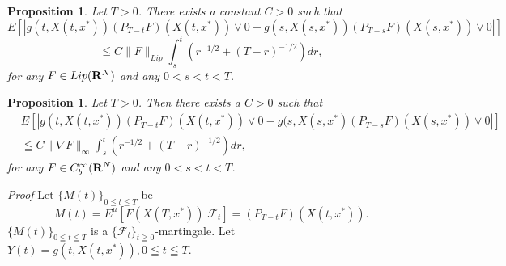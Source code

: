 \documentclass[12pt]{article}
\newtheorem{prop}[thm]{Proposition}%
\begin{document}
\begin{prop}\label{discProp}
Let $T>0$. There exists a constant $C >0$ such that
$$E[|g(t,X(t,x^*))(P_{T-t}F)(X(t,x^*)) \vee 0 - g(s,X(s,x^*))(P_{T-s}F)(X(s,x^*)) \vee 0|]$$
$$\leqq C \|F\|_{{Lip}} \int_{s}^t(r^{-1/2}+(T-r)^{-1/2})dr ,$$ for any $ F \in Lip({\bf R}^{N})$ and any $0< s < t< T$.  
\end{prop} 


\begin{prop}
Let $T>0$. Then there exists a $C>0$ such that 
\begin{align*}
&E[|g(t,X(t,x^*))(P_{T-t}F)(X(t,x^*)) \vee 0 - g(s,X(s,x^*)(P_{T-s}F)(X(s,x^*)) \vee 0|]\\
&\leqq C \|\nabla F\|_{\infty} \int_{s}^t(r^{-1/2}+(T-r)^{-1/2})dr ,
\end{align*}
for any $ F \in C_b^{\infty}({\bf R}^{N})$ and any $0< s < t< T$. 
\end{prop}


{\it Proof}
Let $\{M(t)\}_{0\leqq t \leqq T}$ be
$$M(t) = E^{\mu}[F(X(T,x^*))|\mathcal{F}_t]=(P_{T-t}F)(X(t,x^*)).$$
$\{M(t)\}_{0\leqq t \leqq T}$ is a $\{\mathcal{F}_t\}_{t\geqq 0}$-martingale.
Let $Y(t)=g(t,X(t,x^*)), 0 \leqq t \leqq T.$
\end{document}
